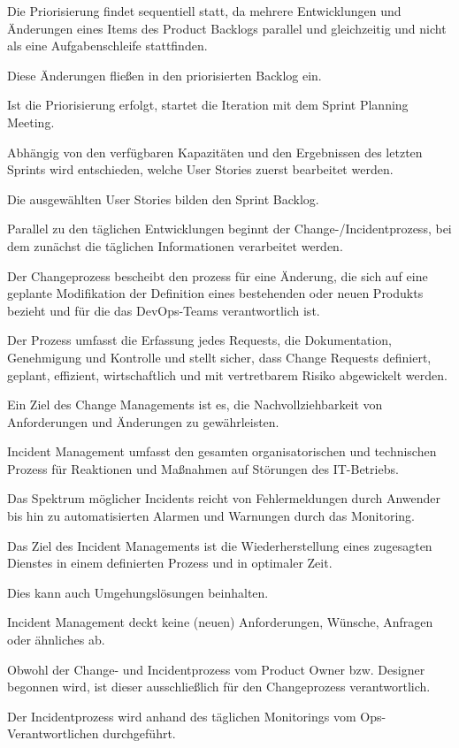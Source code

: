 Die Priorisierung findet sequentiell statt, da mehrere Entwicklungen und Änderungen eines Items des Product Backlogs parallel und gleichzeitig und nicht als eine Aufgabenschleife stattfinden. 

Diese Änderungen fließen in den priorisierten Backlog ein. 

Ist die Priorisierung erfolgt, startet die Iteration mit dem Sprint Planning Meeting. 

Abhängig von den verfügbaren Kapazitäten und den Ergebnissen des letzten Sprints wird entschieden, welche User Stories zuerst bearbeitet werden. 

Die ausgewählten User Stories bilden den Sprint Backlog. 

Parallel zu den täglichen Entwicklungen beginnt der Change-/Incidentprozess, bei dem zunächst die täglichen Informationen verarbeitet werden. 

Der Changeprozess bescheibt den prozess für eine Änderung, die sich auf eine geplante Modifikation der Definition eines bestehenden oder neuen Produkts bezieht und für die das DevOps-Teams verantwortlich ist. 

Der Prozess umfasst die Erfassung jedes Requests, die Dokumentation, Genehmigung und Kontrolle und stellt sicher, dass Change Requests definiert, geplant, effizient, wirtschaftlich und mit vertretbarem Risiko abgewickelt werden. 

Ein Ziel des Change Managements ist es, die Nachvollziehbarkeit von Anforderungen und Änderungen zu gewährleisten.

Incident Management umfasst den gesamten organisatorischen und technischen Prozess für Reaktionen und Maßnahmen auf Störungen des IT-Betriebs.

Das Spektrum möglicher Incidents reicht von Fehlermeldungen durch Anwender bis hin zu automatisierten Alarmen und Warnungen durch das Monitoring.

Das Ziel des Incident Managements ist die Wiederherstellung eines zugesagten Dienstes in einem definierten Prozess und in optimaler Zeit. 

Dies kann auch Umgehungslösungen beinhalten. 

Incident Management deckt keine (neuen) Anforderungen, Wünsche, Anfragen oder ähnliches ab.  

Obwohl der Change- und Incidentprozess vom Product Owner bzw. Designer begonnen wird, ist dieser ausschließlich für den Changeprozess verantwortlich. 

Der Incidentprozess wird anhand des täglichen Monitorings vom Ops-Verantwortlichen durchgeführt. 

